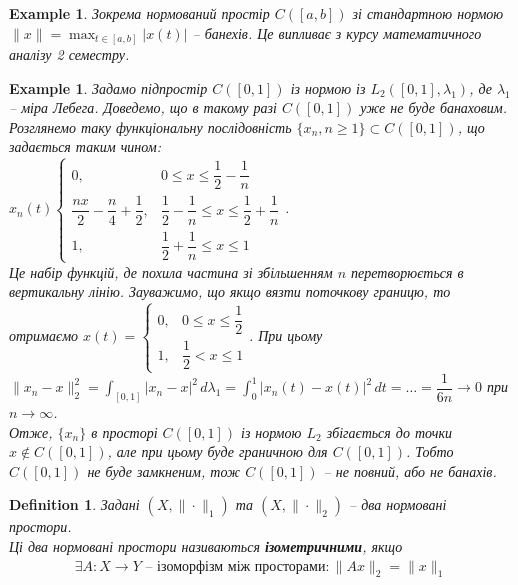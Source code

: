 \documentclass[a4paper, 10pt]{article}
\theoremstyle{theoremdd}
\theoremstyle{theoremdd}
\newtheorem{definition}[theorem]{Definition}
\theoremstyle{theoremdd}
\theoremstyle{theoremdd}
\newtheorem{example}[theorem]{Example}
\theoremstyle{theoremdd}
\theoremstyle{theoremdd}
\theoremstyle{theoremdd}
\theoremstyle{theoremdd}
\begin{document}
\begin{example}
Зокрема нормований простір $C([a,b])$ зі стандартною нормою $\|x\| = \displaystyle\max_{t \in [a,b]} |x(t)|$ -- банехів. Це випливає з курсу математичного аналізу 2 семестру.
\end{example}

\begin{example}
Задамо підпростір $C([0,1])$ із нормою із $L_2([0,1],\lambda_1)$, де $\lambda_1$ -- міра Лебега. Доведемо, що в такому разі $C([0,1])$ уже не буде банаховим.\\
Розглянемо таку функціональну послідовність $\{x_n,n \geq 1\} \subset C([0,1])$, що задається таким чином:\\
$x_n(t) \begin{cases}
0, & 0 \leq x \leq \dfrac{1}{2} - \dfrac{1}{n} \\
\dfrac{nx}{2} - \dfrac{n}{4} + \dfrac{1}{2}, & \dfrac{1}{2} - \dfrac{1}{n} \leq x \leq \dfrac{1}{2} + \dfrac{1}{n} \\
1, & \dfrac{1}{2} + \dfrac{1}{n} \leq x \leq 1
\end{cases}$.\\
Це набір функцій, де похила частина зі збільшенням $n$ перетворюється в вертикальну лінію. Зауважимо, що якщо вязти поточкову границю, то отримаємо $x(t) = \begin{cases} 0, & 0 \leq x \leq \dfrac{1}{2} \\1, & \dfrac{1}{2} < x \leq 1 \end{cases}$. При цьому\\
$\|x_n - x\|_2^2 = \displaystyle\int_{[0,1]} |x_n-x|^2\,d\lambda_1 = \int_0^1 |x_n(t)-x(t)|^2\,dt = \dots = \dfrac{1}{6n} \to 0$ при $n \to \infty$.\\
Отже, $\{x_n\}$ в просторі $C([0,1])$ із нормою $L_2$ збігається до точки $x \notin C([0,1])$, але при цьому буде граничною для $C([0,1])$. Тобто $C([0,1])$ не буде замкненим, тож $C([0,1])$ -- не повний, або не банахів.
\end{example}

\begin{definition}
Задані $(X,\|\cdot\|_1)$ та $(X,\|\cdot\|_2)$ -- два нормовані простори.\\
Ці два нормовані простори називаються \textbf{ізометричними}, якщо
\begin{align*}
\exists A \colon X \to Y \text{ -- ізоморфізм між просторами}: \|Ax\|_2 = \|x\|_1
\end{align*}
\end{definition}
\end{document}
